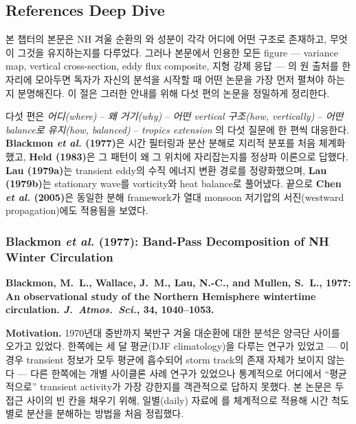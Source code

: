 \subsection{References Deep Dive}

본 챕터의 본문은 NH 겨울 순환의 와  성분이
각각 어디에 어떤 구조로 존재하고, 무엇이 그것을 유지하는지를 다루었다.
그러나 본문에서 인용한 모든 figure --- variance map, vertical cross-section,
eddy flux composite, 지형 강제 응답 --- 의 원 출처를 한자리에 모아두면
독자가 자신의 분석을 시작할 때 어떤 논문을 가장 먼저 펼쳐야 하는지 분명해진다.
이 절은 그러한 안내를 위해 다섯 편의 논문을 정밀하게 정리한다.

다섯 편은 \emph{어디(where)} -- \emph{왜 거기(why)} -- \emph{어떤 vertical 구조(how, vertically)} --
\emph{어떤 balance로 유지(how, balanced)} -- \emph{tropics extension} 의 다섯 질문에
한 편씩 대응한다.  \textbf{Blackmon \emph{et al.} (1977)}은 시간 필터링과 분산 분해로
지리적 분포를 처음 체계화했고, \textbf{Held (1983)}은 그 패턴이 왜 그 위치에 자리잡는지를
정상파 이론으로 답했다.  \textbf{Lau (1979a)}는 transient eddy의 수직 에너지 변환 경로를
정량화했으며, \textbf{Lau (1979b)}는 stationary wave를 vorticity와 heat balance로 풀어냈다.
끝으로 \textbf{Chen \emph{et al.} (2005)}은 동일한 분해 framework가 열대 monsoon
저기압의 서진(westward propagation)에도 적용됨을 보였다.



\subsubsection{Blackmon \emph{et al.} (1977): Band-Pass Decomposition of NH Winter Circulation}

\textbf{Blackmon, M.~L., Wallace, J.~M., Lau, N.-C., and Mullen, S.~L., 1977:
An observational study of the Northern Hemisphere wintertime circulation.
\emph{J.\ Atmos.\ Sci.}, \textbf{34}, 1040--1053.}

\medskip
\noindent\textbf{Motivation.}\quad
1970년대 중반까지 북반구 겨울 대순환에 대한 분석은 양극단 사이를 오가고 있었다.
한쪽에는 세 달 평균(DJF climatology)을 다루는 연구가 있었고 --- 이 경우 transient
정보가 모두 평균에 흡수되어 storm track의 존재 자체가 보이지 않는다 --- 다른 한쪽에는
개별 사이클론 사례 연구가 있었으나 통계적으로 어디에서 ``평균적으로''
transient activity가 가장 강한지를 객관적으로 답하지 못했다.
본 논문은 두 접근 사이의 빈 칸을 채우기 위해, 일별(daily) 자료에 를
체계적으로 적용해 시간 척도별로 분산을 분해하는 방법을 처음 정립했다.

